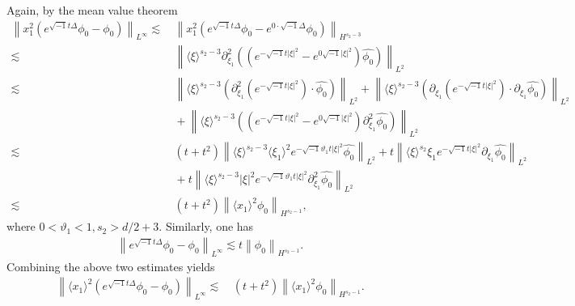 \documentclass[10pt,twoside,a4paper]{article}
\numberwithin{equation}{section}\allowdisplaybreaks
\begin{document}
Again, by the mean value theorem 
\begin{align*}
	\left\| x_1^2 (e^{\sqrt{-1} t\Delta } \phi_0 -\phi_0 ) \right\|_{L^{\infty}} \lesssim &\,\left\|x_1^2 (e^{\sqrt{-1} t\Delta } \phi_0 -e^{0 \cdot\sqrt{-1} \Delta }\phi_0) \right\|_{H^{s_2-3}} \\
	\lesssim &\,  \left\|\langle \xi \rangle^{s_2-3} \partial_{\xi_1}^2\left((e^{-\sqrt{-1} t|\xi|^2 } -e^{0\sqrt{-1} |\xi|^2 })\widehat{\phi_0  }  \right) \right\|_{L^{2}} \\
	\lesssim &\,  \left\|\langle \xi \rangle^{s_2-3} \left( \partial_{\xi_1}^2(e^{-\sqrt{-1} t|\xi|^2 } )\cdot\widehat{\phi_0  }  \right) \right\|_{L^{2}}+  \left\|\langle \xi \rangle^{s_2-3}  \left( \partial_{\xi_1}(e^{-\sqrt{-1} t|\xi|^2 } )\cdot  \partial_{\xi_1}\widehat{\phi_0  }  \right)\right\|_{L^{2}} \\ 
	&\,+\left\|\langle \xi \rangle^{s_2-3} \left((e^{-\sqrt{-1} t|\xi|^2 } -e^{0\sqrt{-1} |\xi|^2 })\partial_{\xi_1}^2\widehat{\phi_0  }  \right) \right\|_{L^{2}}  \\
	\lesssim & \,(t+t^2) \left\|\langle \xi \rangle^{s_2-3}  \langle \xi_1 \rangle^2   e^{-\sqrt{-1} \vartheta_1 t|\xi|^2 }   \widehat{\phi_0  } \right\|_{L^2}+t \left\|\langle \xi \rangle^{s_2}   \xi_1 e^{-\sqrt{-1}   t|\xi|^2 }   \partial_{\xi_1} \widehat{\phi_0  } \right\|_{L^2} \\
	&\,+t \left\|\langle \xi \rangle^{s_2-3}  |\xi|^2 e^{-\sqrt{-1} \vartheta_1 t|\xi|^2 }   \partial_{\xi_1}^2\widehat{\phi_0  } \right\|_{L^2}\\
	\lesssim&\, (t+t^2) \left\| \langle x_1 \rangle^2  \phi_0\right\|_{H^{s_2-1}},
\end{align*}
where $0< \vartheta_1<1, s_2>d/2+3 $.
Similarly, one has
\begin{align*}
	\left\|e^{\sqrt{-1} t\Delta } \phi_0-\phi_0\right\|_{L^{\infty}} \lesssim  t \left\|\phi_0\right\|_{H^{s_2-1}}.
\end{align*}
Combining the above two estimates yields
\begin{align}
	\left\| \langle x_1\rangle^2  (e^{\sqrt{-1} t\Delta } \phi_0 -\phi_0 ) \right\|_{L^{\infty}} \lesssim & \,  (t+t^2) \left\| \langle x_1 \rangle^2  \phi_0\right\|_{H^{s_2-1}}.
\end{align}
\end{document}
